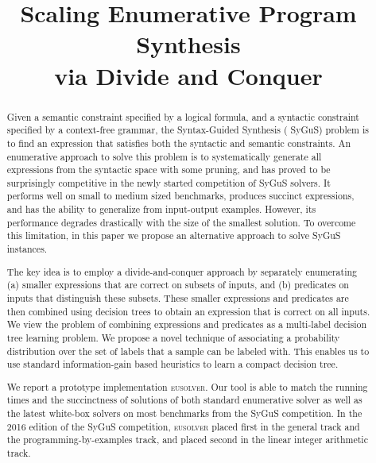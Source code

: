 \documentclass{llncs}
\newcommand\arsays[1]{{\color{red} \bf AR: #1}}
\newcommand{\sygus}{{\sffamily\fontsize{8.5}{10}\selectfont
    SyGuS}\xspace}
\newcommand{\eusolver}{\textsc{eusolver}\xspace}
\begin{document}


\pagestyle{plain}
\title{\texorpdfstring{Scaling Enumerative Program Synthesis\\via
    Divide and Conquer}{Scaling Enumerative Program Synthesis via Divide and Conquer}}
\author{}
\institute{}
\maketitle
\vspace*{-6ex}

\begin{abstract}
  Given a semantic constraint specified by a logical formula, and
  a syntactic constraint specified by a context-free grammar, the
  Syntax-Guided Synthesis (\sygus) problem is to find an expression
  that satisfies both the syntactic and semantic constraints.
  An enumerative approach to solve this problem is to systematically
  generate all expressions from the syntactic space with some pruning,
  and has proved to be surprisingly competitive in the newly started
  competition of \sygus solvers.  It performs well on small to medium sized
  benchmarks, produces succinct expressions, and has the ability to
  generalize from input-output examples.  However, its performance
  degrades drastically with the size of the smallest solution. To overcome
  this limitation, in this paper we propose an alternative approach to
  solve \sygus instances.

  The key idea  is to employ a divide-and-conquer approach by
  separately enumerating (a) smaller expressions that are correct on
  subsets of inputs, and (b) predicates on inputs that distinguish these
  subsets.  These smaller expressions and predicates are then combined
  using decision trees to obtain an expression that is correct on all
  inputs.  We view the problem of combining expressions and predicates as
  a multi-label decision tree learning problem. We propose a novel
  technique of associating a probability distribution over the set of
  labels that a sample can be labeled with. This enables us to use
  standard information-gain based heuristics to learn a compact decision
  tree.

  We report a prototype implementation \eusolver. Our tool is able to
  match the running times and the succinctness of solutions of both
  standard enumerative solver as well as the latest white-box solvers on
  most benchmarks from the \sygus competition. In the 2016 edition of
  the \sygus competition, \eusolver placed first in the general track
  and the programming-by-examples track, and placed second in the linear
  integer arithmetic track. 
\end{abstract}
\end{document}
